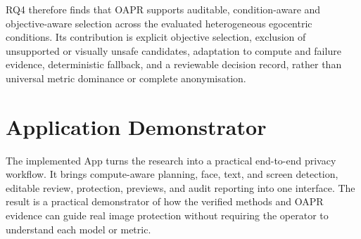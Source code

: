 \documentclass[10pt,twocolumn]{IEEEtran}
\begin{document}
\begin{strip}
\begin{minipage}[t]{0.485\textwidth}
RQ4 therefore finds that OAPR supports auditable, condition-aware and
objective-aware selection across the evaluated heterogeneous egocentric
conditions. Its contribution is explicit objective selection, exclusion of
unsupported or visually unsafe candidates, adaptation to compute and failure
evidence, deterministic fallback, and a reviewable decision record, rather than
universal metric dominance or complete anonymisation.
\end{minipage}
\vspace{-44pt}
\end{strip}
\mbox{}

\clearpage

\section{Application Demonstrator}
\label{sec:demonstrator}

The implemented App turns the research into a practical end-to-end privacy
workflow. It brings compute-aware planning, face, text, and screen detection,
editable review, protection, previews, and audit reporting into one interface.
The result is a practical demonstrator of how the verified methods and OAPR
evidence can guide real image protection without requiring the operator to
understand each model or metric.
\end{document}
